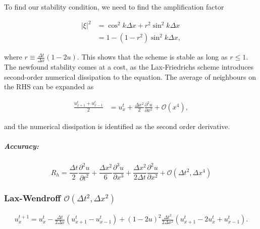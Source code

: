 \documentclass[11pt]{article}
\begin{document}
To find our stability condition, we need to find the amplification
factor

\begin{align}
     |\xi|^2 &= \cos^2{k\Delta x} + r^2 \sin^2{k\Delta x} \\ 
             &= 1 - (1 - r^2)\sin^2{k\Delta x},
 \end{align}

where $ r \equiv \frac{\Delta t}{\Delta x}(1 - 2u) $. This shows that
the scheme is stable as long as $ r \leq 1$. The newfound stability
comes at a cost, as the Lax-Friedrichs scheme introduces second-order
numerical dissipation to the equation. The average of neighbours on the
RHS can be expanded as

\begin{align}
     \frac{u_{x+1}^t + u_{x-1}^t}{2} &= u_x^t + \frac{\Delta x^2}{2}\frac{\partial^2 u}{\partial x^2} + \mathcal{O}(x^4),
 \end{align}

and the numerical dissipation is identified as the second order
derivative.

\subparagraph{Accuracy:}\label{accuracy}

\begin{equation}
R_h = \frac{\Delta t}{2}\frac{\partial^2 u}{\partial t^2} + \frac{\Delta x^2}{6}\frac{\partial^3 u}{\partial x^3} + \frac{\Delta x^2}{2\Delta t}\frac{\partial^2 u}{\partial x^2} + \mathcal{O}(\Delta t^2, \Delta x^4)
\end{equation}

    \subsubsection{\texorpdfstring{Lax-Wendroff
\(\mathcal{O}(\Delta t^2, \Delta x^2)\)}{Lax-Wendroff \textbackslash{}mathcal\{O\}(\textbackslash{}Delta t\^{}2, \textbackslash{}Delta x\^{}2)}}\label{lax-wendroff-mathcalodelta-t2-delta-x2}

\begin{align}
    u_x^{t+1} = u_x^t - \frac{\Delta t}{2 \Delta x}(u_{x+1}^t - u_{x-1}^t) + (1-2u)^2\frac{\Delta t^2}{2 \Delta x^2} (u_{x+1}^t - 2u_x^t + u_{x-1}^t). 
 \end{align}
\end{document}
